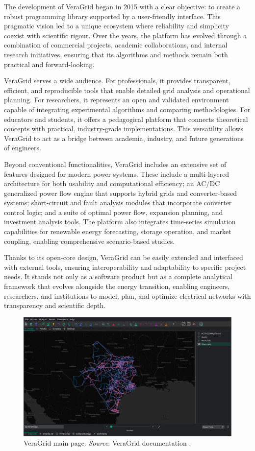 The development of VeraGrid began in 2015 with a clear objective: to create a robust programming library supported by a user-friendly interface. 
This pragmatic vision led to a unique ecosystem where reliability and simplicity coexist with scientific rigour. Over the years, the platform has evolved through a combination 
of commercial projects, academic collaborations, and internal research initiatives, ensuring that its algorithms and methods remain both practical and forward-looking. 


VeraGrid serves a wide audience. For professionals, it provides transparent, efficient, and reproducible tools that enable detailed grid analysis and operational planning. 
For researchers, it represents an open and validated environment capable of integrating experimental algorithms and comparing methodologies. For educators and students, 
it offers a pedagogical platform that connects theoretical concepts with practical, industry-grade implementations. This versatility allows VeraGrid to act as a bridge between 
academia, industry, and future generations of engineers.

Beyond conventional functionalities, VeraGrid includes an extensive set of features designed for modern power systems. 
These include a multi-layered architecture for both usability and computational efficiency; an AC/DC generalized power flow engine that supports hybrid 
grids and converter-based systems; short-circuit and fault analysis modules that incorporate converter control logic; and a suite of optimal power flow, expansion planning, 
and investment analysis tools. The platform also integrates time-series simulation capabilities for renewable energy forecasting, storage operation, and market coupling, 
enabling comprehensive scenario-based studies. 

Thanks to its open-core design, VeraGrid can be easily extended and interfaced with external tools, ensuring interoperability and adaptability to specific project needs. 
It stands not only as a software product but as a complete analytical framework that evolves alongside the energy transition, enabling engineers, researchers, and institutions 
to model, plan, and optimize electrical networks with transparency and scientific depth.

\begin{figure}[H]
  \centering
  \includegraphics[width=0.8\linewidth]{figures/VeraGrid_main_page.png}
  \caption{VeraGrid main page. \textit{Source}: VeraGrid documentation \cite{veragrid}.}
  \label{fig:VeraGrid_main}
\end{figure}


\newpage